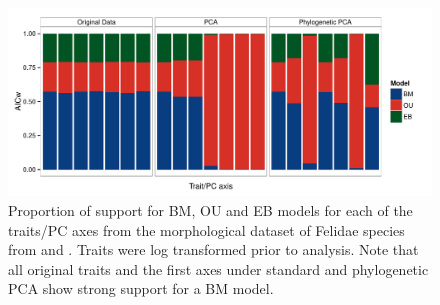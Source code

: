\documentclass[12pt,twoside]{article}
\begin{document}
\begin{figure}[p]
\centering
\includegraphics[scale=0.65]{fig/felidae_aicw.pdf}
\caption[Model support on the Felidae dataset]{Proportion of support for BM, OU and EB models for each of the traits/PC axes from the morphological dataset of Felidae species from \citet{Slater_2009} and \citet{sakamoto_2010}. Traits were log transformed prior to analysis. Note that all original traits and the first axes under standard and phylogenetic PCA show strong support for a BM model.}
\label{felidae.aicw}
\end{figure}
\end{document}
